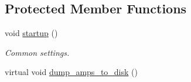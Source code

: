 \subsection*{Protected Member Functions}
\begin{DoxyCompactItemize}
\item 
void \mbox{\hyperlink{classforte_1_1_dynamic_correlation_solver_ac071ebcb164f9f4a0d573c65602e3f8a}{startup}} ()
\begin{DoxyCompactList}\small\item\em Common settings. \end{DoxyCompactList}\item 
virtual void \mbox{\hyperlink{classforte_1_1_dynamic_correlation_solver_a504b343c559a62b9d13ecf8cec44f3d2}{dump\+\_\+amps\+\_\+to\+\_\+disk}} ()
\end{DoxyCompactItemize}
